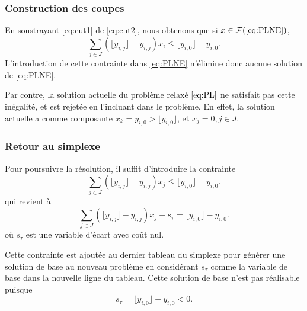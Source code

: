 \documentclass[usepdftitle=false, aspectratio=169]{beamer}
\def\cF{\mathcal{F}}
\begin{document}
\begin{frame}
\frametitle{Construction des coupes}

En soustrayant \eqref{eq:cut1} de \eqref{eq:cut2}, nous  obtenons que si $x \in \cF(\ref{eq:PLNE})$,
$$
\sum_{j \in J} \left( \lfloor y_{i,j} \rfloor - y_{i,j} \right) x_i \leq \lfloor y_{i,0} \rfloor - y_{i,0}.
$$
L'introduction de cette contrainte dans \eqref{eq:PLNE} n'élimine donc aucune solution de \eqref{eq:PLNE}.

\mbox{}

Par contre, la solution actuelle du problème relaxé $\eqref{eq:PL}$ ne satisfait pas cette inégalité, et est rejetée en l'incluant dans le problème. En effet, la solution actuelle a comme composante $x_k = y_{i,0} > \lfloor y_{i,0} \rfloor$, et $x_j = 0, j \in J$.

\end{frame}

\begin{frame}
\frametitle{Retour au simplexe}

Pour poursuivre la résolution, il suffit d'introduire la contrainte
$$
\sum_{j \in J} \left( \lfloor y_{i,j} \rfloor - y_{i,j} \right) x_j \leq \lfloor y_{i,0} \rfloor - y_{i,0}.
$$
qui revient à
$$
\sum_{j \in J} \left( \lfloor y_{i,j} \rfloor - y_{i,j} \right) x_j + s_{\tau} = \lfloor y_{i,0} \rfloor - y_{i,0}.
$$
où $s_{\tau}$ est une variable d'écart avec coût nul.

\mbox{}

Cette contrainte est ajoutée au dernier tableau du simplexe pour générer une solution de base au nouveau problème en considérant $s_{\tau}$ comme la variable de base dans la nouvelle ligne du tableau.
Cette solution de base n'est pas réalisable puisque
$$
s_{\tau} = \lfloor y_{i,0} \rfloor - y_{i,0} < 0.
$$

\end{frame}
\end{document}
